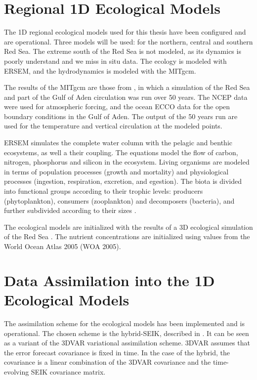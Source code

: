 \section{Regional 1D Ecological Models}

The 1D regional ecological models used for this thesis have been configured and
are operational. Three models will be used: for the northern, central and
southern Red Sea. The extreme south of the Red Sea is not modeled, as its dynamics
is poorly understand and we miss in situ data.
The ecology is modeled with ERSEM, and the hydrodynamics is
modeled with the MITgcm.

The results of the MITgcm are those from \citet{Yao2014, Yao2014b}, in which a
simulation of the Red Sea and part of the Gulf of Aden circulation was run over
50 years. The NCEP data were used for atmospheric forcing, and the ocean ECCO
data for the open boundary conditions in the Gulf of Aden. The output of the 50
years run are used for the temperature and vertical circulation at the modeled
points.

ERSEM simulates the complete water column with the pelagic and benthic
ecosystems, as well a their coupling. The equations model the flow of carbon,
nitrogen, phosphorus and silicon in the ecosystem. Living organisms are modeled
in terms of population processes (growth and mortality) and physiological
processes (ingestion, respiration, excretion, and egestion). The biota is
divided into functional groups according to their trophic levels: producers
(phytoplankton), consumers (zooplankton) and decomposers (bacteria), and
further subdivided according to their sizes \citep{Baretta1995}.

The ecological models are initialized with the results of a 3D ecological
simulation of the Red Sea \citep{Triantafyllou2014}. The nutrient
concentrations are initialized using values from the World Ocean Atlas 2005
(WOA 2005).

\section{Data Assimilation into the 1D Ecological Models}

The assimilation scheme for the ecological models has been implemented and is
operational. The chosen scheme is the hybrid-SEIK, described in
\citet{Hamill2000}. It can be seen as a variant of the 3DVAR variational
assimilation scheme. 3DVAR assumes that the error forecast covariance is
fixed in time. In the case of the hybrid, the covariance is a linear combination
of the 3DVAR covariance and the time-evolving SEIK covariance matrix.

